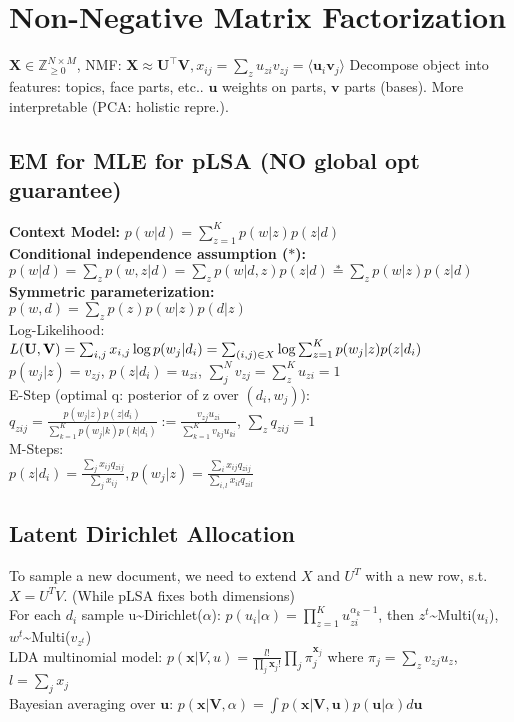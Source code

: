 \section{Non-Negative Matrix Factorization}
$\mathbf{X} \in \mathbb{Z}^{N \times M}_{\geq 0}$, NMF: $\mathbf{X} \approx \mathbf{U^\top V}, x_{ij}=\sum_z{u_{zi}v_{zj}}=\langle\mathbf{u}_i \mathbf{v}_j\rangle$
Decompose object into features: topics, face parts, etc.. $\mathbf{u}$ weights on parts, $\mathbf{v}$ parts (bases). More interpretable (PCA: holistic repre.).

\subsection*{EM for MLE for pLSA (NO global opt guarantee)}
\textbf{Context Model:} $p(w | d) = \sum_{z=1}^K p(w | z) p(z | d)$\\
\textbf{Conditional independence assumption ($*$):}\\
$p(w|d) = \sum_z p(w,z|d) = \sum_z p(w|d,z)p(z|d) \stackrel{*}{=} \sum_z p(w|z)p(z|d)$\\
\textbf{Symmetric parameterization:}\\
$p(w, d) = \sum_z p(z)p(w | z) p(d | z)$ \\
Log-Likelihood: $L(\mathbf{U}, \mathbf{V}) = \sum_{i,j} x_{i,j}\log p(w_j|d_i) \\
= \sum_{(i,j) \in X} \log \sum_{z=1}^K p(w_j|z)p(z|d_i)$ \\ 
$ p(w_j|z) = v_{zj}$, $p(z|d_i) = u_{zi}$, $\sum_j^N v_{zj} = \sum_z^K u_{zi} = 1$\\
E-Step (optimal q: posterior of z over $(d_i, w_j)$):\\
$q_{zij} = \frac{p(w_j|z)p(z|d_i)}{\sum_{k=1}^K p(w_j|k)p(k|d_i)} := \frac{v_{zj}u_{zi}}{\sum_{k=1}^K v_{kj}u_{ki}}$, $\sum_z q_{zij}=1$\\
M-Steps:\\
$p(z|d_i) = \frac{\sum_j x_{ij}q_{zij}}{\sum_j x_{ij}}, p(w_j|z) = \frac{\sum_i x_{ij}q_{zij}}{\sum_{i,l}x_{il}q_{zil}}$\\

\subsection*{Latent Dirichlet Allocation}
To sample a new document, we need to extend $X$ and $U^T$ with a new row, s.t. $X=U^T V$. (While pLSA fixes both dimensions)\\
For each $d_i$ sample u\textasciitilde Dirichlet($\alpha$): $p(u_i|\alpha) = \prod_{z=1}^K u_{zi}^{\alpha_k-1}$, then $z^t$\textasciitilde Multi($u_i$), $w^t$\textasciitilde Multi($v_{z^t}$)\\
LDA multinomial model: $p(\mathbf{x}|V,u) = \frac{l!}{\prod_j \mathbf{x}_j!}\prod_j \pi_j^{\mathbf{x}_j}$ 
where $\pi_j=\sum_z v_{zj} u_z$, $l=\sum_j x_j$ \\
Bayesian averaging over $\mathbf{u}$: $p(\mathbf{x}|\mathbf{V},\alpha)=\int p(\mathbf{x}|\mathbf{V},\mathbf{u})p(\mathbf{u}|\alpha)d\mathbf{u}$

